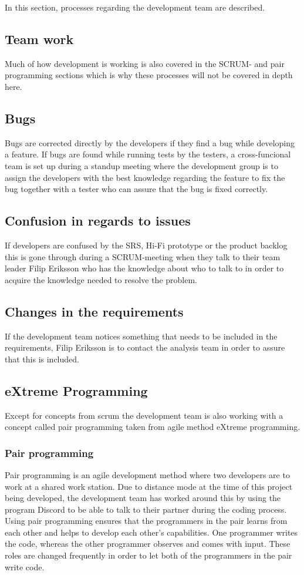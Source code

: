 In this section, processes regarding the development team are described. 
\subsection{Team work}
Much of how development is working is also covered in the SCRUM- and pair programming sections which is why these processes will not be covered in depth here. 
\subsection{Bugs}
Bugs are corrected directly by the developers if they find a bug while developing a feature. If bugs are found while running tests by the testers, a cross-funcional team is set up during a standup meeting where the development group is to assign the developers with the best knowledge regarding the feature to fix the bug together with a tester who can assure that the bug is fixed correctly. 
\subsection{Confusion in regards to issues}
If developers are confused by the SRS, Hi-Fi prototype or the product backlog this is gone through during a SCRUM-meeting when they talk to their team leader Filip Eriksson who has the knowledge about who to talk to in order to acquire the knowledge needed to resolve the problem. 
\subsection{Changes in the requirements}
If the development team notices something that needs to be included in the requirements, Filip Eriksson is to contact the analysis team in order to assure that this is included. 

\subsection{eXtreme Programming}
Except for concepts from scrum the development team is also working with a concept called pair programming taken from agile method eXtreme programming. 
\subsubsection{Pair programming}
Pair programming is an agile development method where two developers are to work at a shared work station. Due to distance mode at the time of this project being developed, the development team has worked around this by using the program Discord to be able to talk to their partner during the coding process. Using pair programming ensures that the programmers in the pair learns from each other and helps to develop each other's capabilities. One programmer writes the code, whereas the other programmer observes and comes with input. These roles are changed frequently in order to let both of the programmers in the pair write code. 